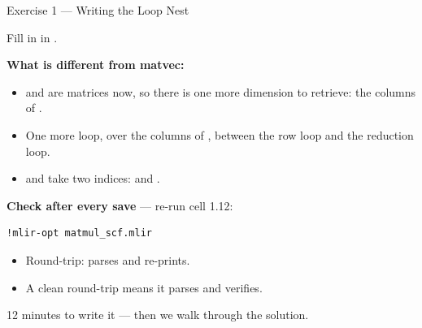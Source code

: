 \documentclass[aspectratio=169,10pt]{beamer}
\begin{document}
\begin{frame}[fragile]{Exercise 1 --- Writing the Loop Nest}
  \begin{center}\large
    Fill in  in .
  \end{center}
  \vspace{0.2em}
  \textbf{What is different from matvec:}
  \begin{itemize}
    \item {} and  are matrices now, so there is one more dimension
      to retrieve: the columns of .
    \item One more loop, over the columns of , between the row loop and
      the reduction loop.
    \item {} and  take two indices:  and
      .
  \end{itemize}
  \vspace{0.5em}
  \textbf{Check after every save} --- re-run cell 1.12:
\begin{lstlisting}[style=plain,basicstyle=\ttfamily\small]
!mlir-opt matmul_scf.mlir
\end{lstlisting}
  \vspace{0.2em}
  \begin{itemize}
    \item Round-trip:  parses and re-prints.
    \item A clean round-trip means it \alert{parses and verifies}.
  \end{itemize}
  \vspace{0.5em}
  \begin{center}\color{scaccent}\large
    12 minutes to write it --- then we walk through the solution.
  \end{center}
\end{frame}
\end{document}
